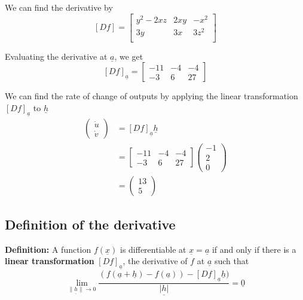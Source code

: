 We can find the derivative by \[
   [Df] = \begin{bmatrix}
      y^2 - 2xz & 2xy & -x^2 \\
      3y & 3x & 3z^2 \\
   \end{bmatrix}
\] 

Evaluating the derivative at $ \underline{a}$, we get
\[
   [Df]_{ \underline{a}} = \begin{bmatrix}
      -11 & -4 & -4 \\
      -3 & 6 & 27
   \end{bmatrix}
\]  

We can find the rate of change of outputs by applying the linear transformation $[Df]_{ \underline{a} }$ to $ \underline{h}$
\begin{align*}
   \begin{pmatrix} \dot u \\ \dot v \end{pmatrix}  &= [Df]_{ \underline{a} } \underline{h} \\
                                                   &= \begin{bmatrix} 
                                                      -11 & -4 & -4 \\ 
                                                      -3 & 6 & 27
                                                   \end{bmatrix} \begin{pmatrix} -1 \\ 2 \\ 0 \end{pmatrix} \\
                                                         &= \begin{pmatrix} 13 \\ 5 \end{pmatrix} 
\end{align*}

\subsection{Definition of the derivative}

\begin{framed}
   \textbf{Definition:} A function $f( \underline{x})$ is differentiable at $ \underline{x} = \underline{a} $ if and only if there is a \textbf{linear transformation} $[Df]_{ \underline{a}}$, the derivative of $f$ at $ \underline{a} $ such that \[
      \lim_{ \underline{ \lVert h \rVert } \to 0} \frac{\left(f \left(  \underline{a} + \underline{h} \right)  - f \left( \underline{a} \right) \right)-[Df]_{ \underline{a}} \underline{h})}{ \underline{ | h | }} = \underline{0}
   \]  
\end{framed}

